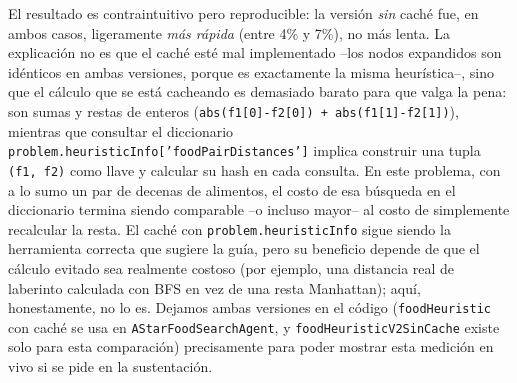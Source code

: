 El resultado es contraintuitivo pero reproducible: la versión \emph{sin} caché fue, en ambos casos,
ligeramente \emph{más rápida} (entre 4\% y 7\%), no más lenta. La explicación no es que el caché
esté mal implementado --los nodos expandidos son idénticos en ambas versiones, porque es
exactamente la misma heurística--, sino que el cálculo que se está cacheando es demasiado barato
para que valga la pena: son sumas y restas de enteros (\texttt{abs(f1[0]-f2[0]) + abs(f1[1]-f2[1])}),
mientras que consultar el diccionario \texttt{problem.heuristicInfo['foodPairDistances']} implica
construir una tupla \texttt{(f1, f2)} como llave y calcular su hash en cada consulta. En este
problema, con a lo sumo un par de decenas de alimentos, el costo de esa búsqueda en el diccionario
termina siendo comparable --o incluso mayor-- al costo de simplemente recalcular la resta. El
caché con \texttt{problem.heuristicInfo} sigue siendo la herramienta correcta que sugiere la guía,
pero su beneficio depende de que el cálculo evitado sea realmente costoso (por ejemplo, una
distancia real de laberinto calculada con BFS en vez de una resta Manhattan); aquí, honestamente,
no lo es. Dejamos ambas versiones en el código (\texttt{foodHeuristic} con caché se usa en
\texttt{AStarFoodSearchAgent}, y \texttt{foodHeuristicV2SinCache} existe solo para esta comparación)
precisamente para poder mostrar esta medición en vivo si se pide en la sustentación.
